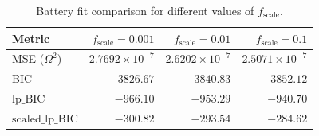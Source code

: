 \documentclass[
    11pt,
    a4paper,
    oneside
]{article}
\begin{document}
\begin{table}[htbp]
\centering
\caption{Battery fit comparison for different values of
\(f_{\mathrm{scale}}\).}
\label{tab:battery_fscale_comparison}
\begin{tabular}{lrrr}
\toprule
Metric
& \(f_{\mathrm{scale}}=0.001\)
& \(f_{\mathrm{scale}}=0.01\)
& \(f_{\mathrm{scale}}=0.1\) \\
\midrule
MSE (\(\Omega^2\))
& \(2.7692\times10^{-7}\)
& \(2.6202\times10^{-7}\)
& \(2.5071\times10^{-7}\) \\

BIC
& \(-3826.67\)
& \(-3840.83\)
& \(-3852.12\) \\

\(\mathrm{lp\_BIC}\)
& \(-966.10\)
& \(-953.29\)
& \(-940.70\) \\

\(\mathrm{scaled\_lp\_BIC}\)
& \(\mathbf{-300.82}\)
& \(-293.54\)
& \(-284.62\) \\
\bottomrule
\end{tabular}
\end{table}





\clearpage
\nocite{*} 
\printbibliography
%

% 

\end{document}
